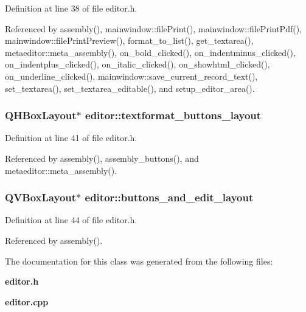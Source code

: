 Definition at line 38 of file editor.h.

Referenced by assembly(), mainwindow::file\-Print(), mainwindow::file\-Print\-Pdf(), mainwindow::file\-Print\-Preview(), format\_\-to\_\-list(), get\_\-textarea(), metaeditor::meta\_\-assembly(), on\_\-bold\_\-clicked(), on\_\-indentminus\_\-clicked(), on\_\-indentplus\_\-clicked(), on\_\-italic\_\-clicked(), on\_\-showhtml\_\-clicked(), on\_\-underline\_\-clicked(), mainwindow::save\_\-current\_\-record\_\-text(), set\_\-textarea(), set\_\-textarea\_\-editable(), and setup\_\-editor\_\-area().
\subsubsection{\setlength{\rightskip}{0pt plus 5cm}QHBox\-Layout$\ast$ {\bf editor::textformat\_\-buttons\_\-layout}}\label{classeditor_1fce99ff90b16ab5ee4419d0f7891901}




Definition at line 41 of file editor.h.

Referenced by assembly(), assembly\_\-buttons(), and metaeditor::meta\_\-assembly().
\subsubsection{\setlength{\rightskip}{0pt plus 5cm}QVBox\-Layout$\ast$ {\bf editor::buttons\_\-and\_\-edit\_\-layout}}\label{classeditor_9cde454ac1e5e51f76f4833b15cc6b7b}




Definition at line 44 of file editor.h.

Referenced by assembly().

The documentation for this class was generated from the following files:\begin{CompactItemize}
\item 
{\bf editor.h}\item 
{\bf editor.cpp}\end{CompactItemize}

